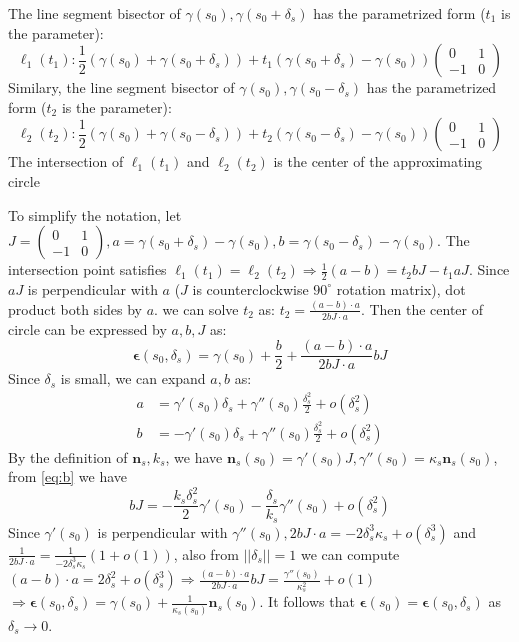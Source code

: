 \begin{solution}
    The line segment bisector of $\gamma(s_0),\gamma(s_0+\delta_s)$ has the parametrized form ($t_1$ is the parameter): 
    $$
    \ell_1(t_1): \frac{1}{2}(\gamma(s_0)+\gamma(s_0+\delta_s)) + t_1 (\gamma(s_0+\delta_s)-\gamma(s_0))\begin{pmatrix}0 & 1 \\ -1 & 0\end{pmatrix}
    $$
    Similary, the line segment bisector of $\gamma(s_0),\gamma(s_0-\delta_s)$ has the parametrized form ($t_2$ is the parameter): 
    $$
    \ell_2(t_2): \frac{1}{2}(\gamma(s_0)+\gamma(s_0-\delta_s)) + t_2 (\gamma(s_0-\delta_s)-\gamma(s_0))\begin{pmatrix}0 & 1 \\ -1 & 0\end{pmatrix} 
    $$
    The intersection of $\ell_1(t_1)$ and $\ell_2(t_2)$ is the center of the approximating circle
    
    To simplify the notation, let $J=\begin{pmatrix}0 & 1 \\ -1 & 0\end{pmatrix},a=\gamma(s_0+\delta_s)-\gamma(s_0),b=\gamma(s_0-\delta_s)-\gamma(s_0)$.
    The intersection point satisfies $\ell_1(t_1)=\ell_2(t_2) \Rightarrow \frac{1}{2}(a-b)=t_2bJ-t_1aJ$.
    Since $aJ$ is perpendicular with $a$ ($J$ is counterclockwise $90^\circ$ rotation matrix), dot product both sides by $a$. we can solve $t_2$ as:
    $t_2=\frac{(a-b)\cdot a}{2bJ\cdot a}$.
    Then the center of circle can be expressed by $a,b,J$ as:
    $$
    \bm{\epsilon}(s_0,\delta_s)=\gamma(s_0)+\frac{b}{2}+\frac{(a-b)\cdot a}{2bJ\cdot a} bJ
    $$
    Since $\delta_s$ is small, we can expand $a,b$ as:
    \begin{subequations}
    \begin{align}
    \label{eq:a}a & = \gamma'(s_0) \delta_s + \gamma''(s_0)\frac{\delta_s^2}{2} +o(\delta_s^2)\\
    \label{eq:b}b & = -\gamma'(s_0) \delta_s + \gamma''(s_0)\frac{\delta_s^2}{2} +o(\delta_s^2)
    \end{align}
    \end{subequations}
    By the definition of $\bm{n}_s,k_s$, we have $\bm{n}_s(s_0) =\gamma'(s_0)J,\gamma''(s_0)=\kappa_s \bm{n}_s(s_0)$, from \eqref{eq:b} we have
    \begin{equation}
    bJ = -\frac{k_s \delta_s^2}{2} \gamma'(s_0) -\frac{\delta_s}{k_s}\gamma''(s_0)+ o(\delta_s^2) 
    \end{equation}
    Since $\gamma'(s_0)$ is perpendicular with $\gamma''(s_0),2bJ\cdot a=-2\delta_s^3 \kappa_s + o(\delta_s^3)$ and $\frac{1}{2bJ\cdot a} =\frac{1}{-2\delta_s^3 \kappa_s}(1+o(1))$, also from $||\delta_s||=1$ we can compute $(a-b)\cdot a = 2\delta_s^2 + o(\delta_s^3)\Rightarrow \frac{(a-b)\cdot a }{2bJ\cdot a}bJ = \frac{\gamma''(s_0)}{\kappa^2_s}+o(1)$$\Rightarrow \bm{\epsilon}(s_0,\delta_s)=\gamma(s_0)+\frac{1}{\kappa_s(s_0)}\bm{n}_s(s_0)$. It follows that $\bm{\epsilon}(s_0)=\bm{\epsilon}(s_0,\delta_s)$ as $\delta_s\to 0$.
\end{solution}
    
